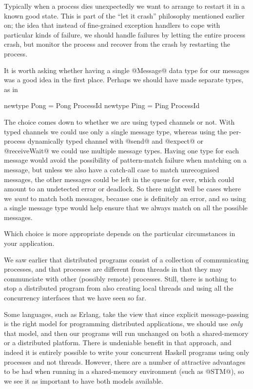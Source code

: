 Typically when a process dies unexpectedly we want to arrange to
restart it in a known good state.  This is part of the ``let it
crash'' philosophy mentioned earlier on; the idea that instead of
fine-grained exception handlers to cope with particular kinds of
failure, we should handle failures by letting the entire process
crash, but monitor the process and recover from the crash by
restarting the process.

It is worth asking whether having a single @Message@ data type for our
messages was a good idea in the first place.  Perhaps we should have
made separate types, as in

\begin{haskell}
newtype Pong = Pong ProcessId
newtype Ping = Ping ProcessId
\end{haskell}

The choice comes down to whether we are using typed channels or not.
With typed channels we could use only a single message type, whereas
using the per-process dynamically typed channel with @send@ and
@expect@ or @receiveWait@ we could use multiple message types.  Having
one type for each message would avoid the possibility of pattern-match
failure when matching on a message, but unless we also have a
catch-all case to match unrecognised messages, the other messages
could be left in the queue for ever, which could amount to an
undetected error or deadlock.  So there might well be cases where we
\emph{want} to match both messages, because one is definitely an
error, and so using a single message type would help ensure that we
always match on all the possible messages.

Which choice is more appropriate depends on the particular
circumstances in your application.




We saw earlier that distributed programs consist of a collection of
communicating processes, and that processes are different from threads
in that they may communciate with other (possibly remote) processes.
Still, there is nothing to stop a distributed program from also
creating local threads and using all the concurrency interfaces that
we have seen so far.

Some languages, such as Erlang, take the view that since explicit
message-passing is the right model for programming distributed
applications, we should use \emph{only} that model, and then our
programs will run unchanged on both a shared-memory or a distributed
platform.  There is undeniable benefit in that approach, and indeed it
is entirely possible to write your concurrent Haskell programs using
only processes and not threads.  However, there are a number of
attractive advantages to be had when running in a shared-memory
environment (such as @STM@), so we see it as important to have both
models available.

